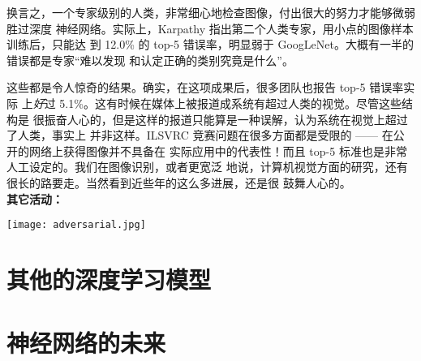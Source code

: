 换言之，一个专家级别的人类，非常细心地检查图像，付出很大的努力才能够微弱胜过深度
神经网络。实际上，Karpathy 指出第二个人类专家，用小点的图像样本训练后，只能达
到 12.0\% 的 top-5 错误率，明显弱于 GoogLeNet。大概有一半的错误都是专家“难以发现
和认定正确的类别究竟是什么”。

这些都是令人惊奇的结果。确实，在这项成果后，很多团队也报告 top-5 错误率实际
上\emph{好}过 5.1\%。这有时候在媒体上被报道成系统有超过人类的视觉。尽管这些结构是
很振奋人心的，但是这样的报道只能算是一种误解，认为系统在视觉上超过了人类，事实上
并非这样。ILSVRC 竞赛问题在很多方面都是受限的 —— 在公开的网络上获得图像并不具备在
实际应用中的代表性！而且 top-5 标准也是非常人工设定的。我们在图像识别，或者更宽泛
地说，计算机视觉方面的研究，还有很长的路要走。当然看到近些年的这么多进展，还是很
鼓舞人心的。\\

\textbf{其它活动：}

\begin{center}
	\texttt{[image: adversarial.jpg]}
\end{center}

\section{其他的深度学习模型}
\label{sec:other_approaches_to_deep_neural_nets}

\section{神经网络的未来}
\label{sec:on_the_future_of_neural_networks}

